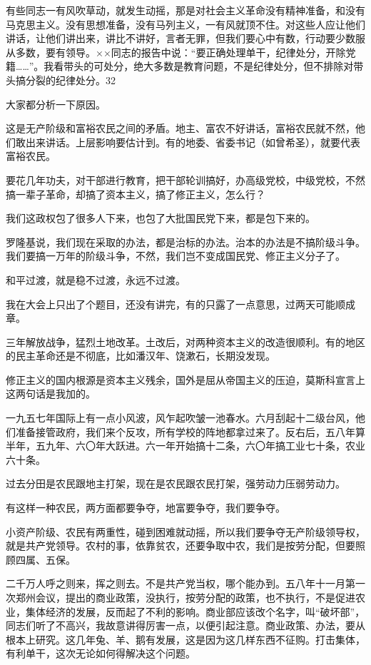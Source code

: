 有些同志一有风吹草动，就发生动摇，那是对社会主义革命没有精神准备，和没有马克思主义。没有思想准备，没有马列主义，一有风就顶不住。对这些人应让他们讲话，让他们讲出来，讲比不讲好，言者无罪，但我们要心中有数，行动要少数服从多数，要有领导。××同志的报告中说：“要正确处理单干，纪律处分，开除党籍……”。我看带头的可处分，绝大多数是教育问题，不是纪律处分，但不排除对带头搞分裂的纪律处分。{\footnotesize 32}

大家都分析一下原因。

这是无产阶级和富裕农民之间的矛盾。地主、富农不好讲话，富裕农民就不然，他们敢出来讲话。上层影响要估计到。有的地委、省委书记（如曾希圣），就要代表富裕农民。

要花几年功夫，对干部进行教育，把干部轮训搞好，办高级党校，中级党校，不然搞一辈子革命，却搞了资本主义，搞了修正主义，怎么行？

我们这政权包了很多人下来，也包了大批国民党下来，都是包下来的。

罗隆基说，我们现在采取的办法，都是治标的办法。治本的办法是不搞阶级斗争。我们要搞一万年的阶级斗争，不然，我们岂不变成国民党、修正主义分子了。

和平过渡，就是稳不过渡，永远不过渡。

我在大会上只出了个题目，还没有讲完，有的只露了一点意思，过两天可能顺成章。

三年解放战争，猛烈土地改革。土改后，对两种资本主义的改造很顺利。有的地区的民主革命还是不彻底，比如潘汉年、饶漱石，长期没发现。

修正主义的国内根源是资本主义残余，国外是屈从帝国主义的压迫，莫斯科宣言上这两句话是我加的。

一九五七年国际上有一点小风波，风乍起吹皱一池春水。六月刮起十二级台风，他们准备接管政府，我们来个反攻，所有学校的阵地都拿过来了。反右后，五八年算半年，五九年、六〇年大跃进。六一年开始搞十二条，六〇年搞工业七十条，农业六十条。

过去分田是农民跟地主打架，现在是农民跟农民打架，强劳动力压弱劳动力。

有这样一种农民，两方面都要争夺，地富要争夺，我们要争夺。

小资产阶级、农民有两重性，碰到困难就动摇，所以我们要争夺无产阶级领导权，就是共产党领导。农村的事，依靠贫农，还要争取中农，我们是按劳分配，但要照顾四属、五保。

二千万人呼之则来，挥之则去。不是共产党当权，哪个能办到。五八年十一月第一次郑州会议，提出的商业政策，没执行，按劳分配的政策，也不执行，不是促进农业，集体经济的发展，反而起了不利的影响。商业部应该改个名字，叫“破坏部”，同志们听了不高兴，我故意讲得厉害一点，以便引起注意。商业政策、办法，要从根本上研究。这几年兔、羊、鹅有发展，这是因为这几样东西不征购。打击集体，有利单干，这次无论如何得解决这个问题。

